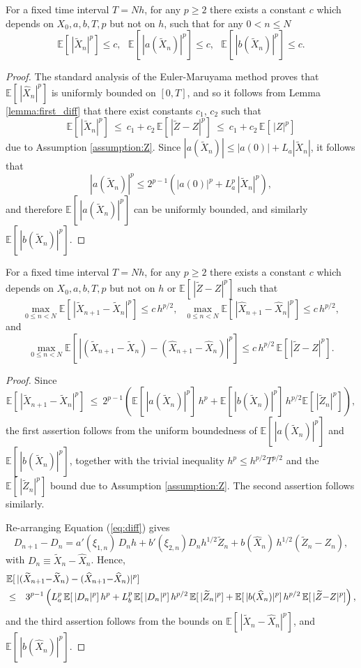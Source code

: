 \documentclass[review]{siamart190516}
\def \EE {{\mathbb{E}}}
\def \tZ {{\widetilde{Z}}}
\def \tXn {{\widetilde{X}_n}}
\def \tXnp {{\widetilde{X}_{n+1}}}
\def \hXn {{\widehat{X}_n}}
\def \hXnp {{\widehat{X}_{n+1}}}
\begin{document}
\begin{corollary}
\label{corollary:bounds}
For a fixed time interval $T\!=\!N h$, for any $p\!\geq\!2$ there exists a 
constant $c$ which depends on $X_0, a, b, T, p$ but not on $h$, 
such that for any $0\!<\!n\!\leq\!N$
\[
\EE[\, |\tXn|^p] \leq c, ~~~
\EE[\, |a(\tXn)|^p] \leq c, ~~~
\EE[\, |b(\tXn)|^p] \leq c.
\]
\end{corollary}
\begin{proof}
The standard analysis of the Euler-Maruyama method proves that $\EE[\, |\hXn|^p]$
is uniformly bounded on $[0,T]$, and so it follows from Lemma \ref{lemma:first_diff} 
that there exist constants $c_1$, $c_2$ such that
\[
\EE[\, |\tXn|^p] 
\ \leq\ c_1 + c_2\, \EE[\, |\tZ{-}Z|^p]
\ \leq\ c_1 + c_2\, \EE[\, |Z|^p ]
\]
due to Assumption \ref{assumption:Z}.
Since $|a(\tXn)| \leq |a(0)| + L_a |\tXn|$, it follows that
\[
|a(\tXn)|^p \leq 2^{p-1} \left( |a(0)|^p + L^p_a\, |\tXn|^p \right),
\]
and therefore $\EE[\, |a(\tXn)|^p]$ can be uniformly bounded, and similarly
$\EE[\, |b(\tXn)|^p]$.
\end{proof}

\begin{corollary}
\label{corollary:delta_t}
For a fixed time interval $T\!=\!N h$, for any $p\!\geq\!2$ there exists a 
constant $c$ which depends on $X_0, a, b, T, p$ but not on $h$ or 
$\EE[\, |\tZ{-}Z|^p]$ such that
\[
\max_{0\leq n < N} \EE[\, |\tXnp{-}\tXn|^p] \leq c\, h^{p/2}, ~~~
\max_{0\leq n < N} \EE[\, |\hXnp{-}\hXn|^p] \leq c\, h^{p/2},
\]
and
\[
\max_{0\leq n < N} \EE\left[\, |(\tXnp{-}\tXn)-(\hXnp{-}\hXn)|^p\right] 
\leq c\, h^{p/2}\, \EE[\, |\tZ{-}Z|^p].
\]
\end{corollary}
\begin{proof}
Since
\[
\EE[\, |\tXnp{-}\tXn|^p]
\ \leq\ 2^{p-1} \left( \EE[\,|a(\tXn)|^p] \, h^p + \EE[\,|b(\tXn)|^p]\, h^{p/2} \EE[\,|\tZ_n|^p] \right),
\]
the first assertion follows from the uniform boundedness of $\EE[\,|a(\tXn)|^p]$ and $\EE[\,|b(\tXn)|^p]$,
together with the trivial inequality $h^p\!\leq\! h^{p/2}T^{p/2}$ and the $\EE[\,|\tZ_n|^p]$ bound due
to Assumption \ref{assumption:Z}. The second assertion follows similarly.

Re-arranging Equation (\ref{eq:diff}) gives
\[
D_{n+1}-D_n = a'(\xi_{1,n})\, D_n h + b'(\xi_{2,n}) D_n h^{1/2} \tZ_n
                                 + b(\hXn) \, h^{1/2} (\tZ_n{-}Z_n),
\]
with $D_n \equiv \tXn{-}\hXn$. Hence,
\begin{eqnarray*}
  \lefteqn{  \EE[\, |(\tXnp{-}\tXn)-(\hXnp{-}\hXn)|^p]}
\\ &\leq& 3^{p-1}\left(
    L_a^p\, \EE[\, |D_n|^p]\, h^p
    + L_b^p\, \EE[\, |D_n|^p]\, h^{p/2}\, \EE[\,|\tZ_n|^p]
    + \EE[\, |b(\hXn)|^p]\, h^{p/2}\, \EE[\,|\tZ{-}Z|^p] \right),
\end{eqnarray*}
and the third assertion follows from the bounds on $\EE[\, |\tXn{-}\hXn|^p]$,
and $\EE[\, |b(\hXn)|^p]$.
\end{proof}
\end{document}
